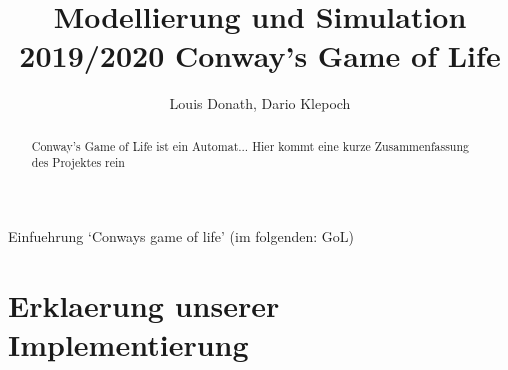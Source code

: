 \documentclass[runningheads]{llncs}
\begin{document}
%
\title{Modellierung und Simulation 2019/2020 Conway's Game of Life}
\author{Louis Donath, Dario Klepoch}
%
\authorrunning{}


\maketitle              

\begin{abstract}
Conway's Game of Life ist ein Automat...
Hier kommt eine kurze Zusammenfassung des Projektes rein
\end{abstract}
%

\begin{section}{Einfuehrung}
    `Conways game of life' (im folgenden: GoL) 
\end{section}

\section{Erklaerung unserer Implementierung}
    
\end{document}
